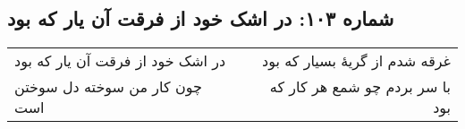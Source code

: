 \begin{center}
\section*{شماره ۱۰۳: در اشک خود از فرقت آن یار که بود}
\label{sec:103}
\begin{longtable}{l p{0.5cm} r}
در اشک خود از فرقت آن یار که بود
&&
غرقه شدم از گریهٔ بسیار که بود
\\
چون کار من سوخته دل سوختن است
&&
با سر بردم چو شمع هر کار که بود
\\
\end{longtable}
\end{center}
